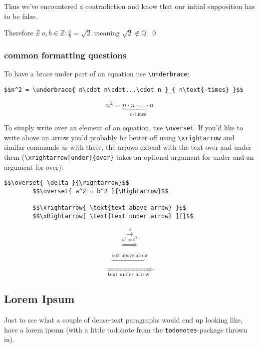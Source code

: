 \documentclass{article}
\begin{document}
    Thus we've encountered a contradiction and know that our initial supposition has to 
    be false. 

    Therefore 
        $\nexists \,\, a,b\in\mathbb{Z} : \frac{a}{b} = \sqrt{2}$
    meaning $\sqrt{2} \not\in \mathbb{Q}$. 
    \qed

    \subsubsection{common formatting questions}
    To have a brace under part of an equation use \verb|\underbrace|:  
    \begin{lstlisting}[style=LaTeX]
        $$n^2 = \underbrace{ n\cdot n\cdot...\cdot n }_{ n\text{-times} }$$
    \end{lstlisting}
        $$n^2 = \underbrace{ n\cdot n\cdot...\cdot n }_{ n\text{-times} }$$

    To simply write over an element of an equation, use \verb|\overset|. 
    If you'd like to write above an arrow you'd probably be better off using 
    \verb|\xrightarrow| and similar commands as with these, the arrows extend with the 
    text over and under them 
    (\verb|\xrightarrow[under]{over}| takes an optional argument for under and an 
    argument for over): 
    \begin{lstlisting}[style=LaTeX]
        $$\overset{ \delta }{\rightarrow}$$
        $$\overset{ a^2 = b^2 }{\Rightarrow}$$

        $$\xrightarrow{ \text{text above arrow} }$$
        $$\xRightarrow[ \text{text under arrow} ]{}$$
    \end{lstlisting}
        $$\overset{ \delta }{\rightarrow}$$
        $$\overset{ a^2 = b^2 }{\Rightarrow}$$

        $$\xrightarrow{ \text{text above arrow} }$$
        $$\xRightarrow[ \text{text under arrow} ]{}$$


    \subsection{Lorem Ipsum}
	Just to see what a couple of dense-text paragraphs would end up looking like, have a 
    lorem ipsum (with a little todonote from the \texttt{todonotes}-package thrown in). 
	
\end{document}
